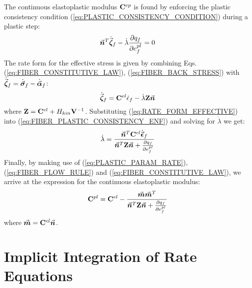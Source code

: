 The continuous elastoplastic modulus $\mathbf{C}^{ep}$ is found by enforcing the
plastic consistency condition (\ref{eq:PLASTIC_CONSISTENCY_CONDITION}) during a 
plastic step:
\begin{equation}
	\vec{\bm{n}}^T\dot{\vec{\bm{\zeta}}}_f-\dot{\lambda}\frac{\partial q_f}{\partial
		e_f^{pl}} = 0
	\label{eq:FIBER_PLASTIC_CONSISTENCY_ENF}
\end{equation}
The rate form for the effective stress is given by combining Eqs.
(\ref{eq:FIBER_CONSTITUTIVE_LAW}), (\ref{eq:FIBER_BACK_STRESS}) with
$\dot{\vec{\bm{\zeta}}}_f = \dot{\vec{\bm{\sigma}}}_f - \dot{\vec{\bm{\alpha}}}_f$:
\begin{equation}
	\dot{\vec{\bm{\zeta}}}_f = \mathbf{C}^{el}\dot{\epsilon}_f -
	\dot{\lambda}\mathbf{Z}\vec{\bm{n}}
	\label{eq:RATE_FORM_EFFECTIVE}
\end{equation}
\noindent where $\mathbf{Z} = \mathbf{C}^{el}+H_{kin}\mathbf{V}^{-1}$.
Substituting (\ref{eq:RATE_FORM_EFFECTIVE}) into
(\ref{eq:FIBER_PLASTIC_CONSISTENCY_ENF}) and solving for $\dot{\lambda}$ we get:
\begin{equation}
	\dot{\lambda} =
	\frac{\vec{\bm{n}}^T\mathbf{C}^{el}\dot{\vec{\bm{\epsilon}}}_f}{\vec{\bm{n}}^T\mathbf{Z}\vec{\bm{n}}+
		\frac{\partial q_f}{\partial e_f^{pl}}}
	\label{eq:PLASTIC_PARAM_RATE}
\end{equation}
Finally, by making use of (\ref{eq:PLASTIC_PARAM_RATE}),
(\ref{eq:FIBER_FLOW_RULE}) and (\ref{eq:FIBER_CONSTITUTIVE_LAW}), we arrive at
the expression for the continuous elastoplastic modulus:
\begin{equation}
	\mathbf{C}^{pl} =
	\mathbf{C}^{el}-\frac{\vec{\bm{m}}\vec{\bm{m}}^T}{\vec{\bm{n}}^T\mathbf{Z}\vec{\bm{n}}+
		\frac{\partial q_f}{\partial e_f^{pl}}}
	\label{eq:CONT_ELASTOPLASTIC_MODULUS}
\end{equation}
\noindent where $\vec{\bm{m}} = \mathbf{C}^{el}\vec{\bm{n}}$.

\section{Implicit Integration of Rate Equations}\label{section:CH3-S4}


